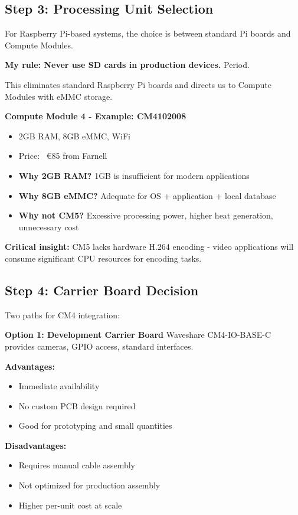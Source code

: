 \subsection{Step 3: Processing Unit Selection}

For Raspberry Pi-based systems, the choice is between standard Pi boards and Compute Modules.

\textbf{My rule: Never use SD cards in production devices.} Period.

This eliminates standard Raspberry Pi boards and directs us to Compute Modules with eMMC storage.

\textbf{Compute Module 4 - Example: CM4102008}
\begin{itemize}
\item 2GB RAM, 8GB eMMC, WiFi
\item Price: ~€85 from Farnell
\item \textbf{Why 2GB RAM?} 1GB is insufficient for modern applications
\item \textbf{Why 8GB eMMC?} Adequate for OS + application + local database
\item \textbf{Why not CM5?} Excessive processing power, higher heat generation, unnecessary cost
\end{itemize}

\textbf{Critical insight:} CM5 lacks hardware H.264 encoding - video applications will consume significant CPU resources for encoding tasks.

\subsection{Step 4: Carrier Board Decision}

Two paths for CM4 integration:

\textbf{Option 1: Development Carrier Board}
Waveshare CM4-IO-BASE-C provides cameras, GPIO access, standard interfaces.

\textbf{Advantages:}
\begin{itemize}
\item Immediate availability
\item No custom PCB design required
\item Good for prototyping and small quantities
\end{itemize}

\textbf{Disadvantages:}
\begin{itemize}
\item Requires manual cable assembly
\item Not optimized for production assembly
\item Higher per-unit cost at scale
\end{itemize}

